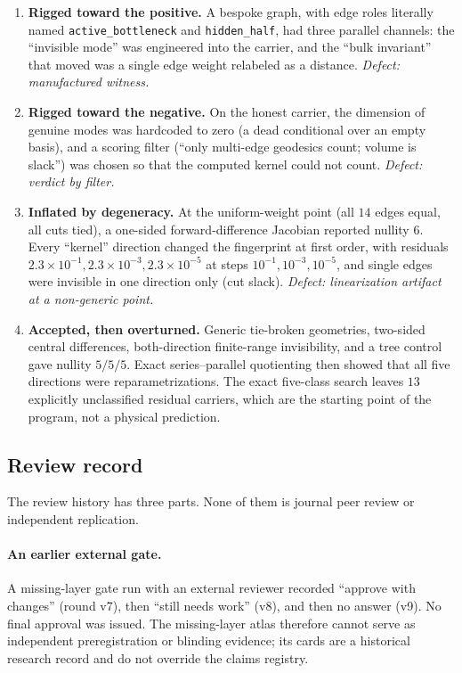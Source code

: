 \documentclass[11pt]{article}
\theoremstyle{definition}
\providecommand{\tightlist}{\setlength{\itemsep}{0pt}\setlength{\parskip}{0pt}}
\begin{document}
\begin{enumerate}\tightlist
\item \textbf{Rigged toward the positive.} A bespoke graph, with edge roles literally named
  \texttt{active\_bottleneck} and \texttt{hidden\_half}, had three parallel channels: the ``invisible mode'' was
  engineered into the carrier, and the ``bulk invariant'' that moved was a single edge weight relabeled as a distance.
  \emph{Defect: manufactured witness.}
\item \textbf{Rigged toward the negative.} On the honest carrier, the dimension of genuine modes was hardcoded to zero
  (a dead conditional over an empty basis), and a scoring filter (``only multi-edge geodesics count; volume is slack'')
  was chosen so that the computed kernel could not count. \emph{Defect: verdict by filter.}
\item \textbf{Inflated by degeneracy.} At the uniform-weight point (all \(14\) edges equal, all cuts tied), a one-sided
  forward-difference Jacobian reported nullity \(6\). Every ``kernel'' direction changed the fingerprint at first
  order, with residuals \(2.3\times10^{-1},2.3\times10^{-3},2.3\times10^{-5}\) at steps \(10^{-1},10^{-3},10^{-5}\), and
  single edges were invisible in one direction only (cut slack). \emph{Defect: linearization artifact at a non-generic
  point.}
\item \textbf{Accepted, then overturned.} Generic tie-broken geometries, two-sided central differences, both-direction
  finite-range invisibility, and a tree control gave nullity \(5/5/5\). Exact series--parallel quotienting then showed
  that all five directions were reparametrizations. The exact five-class search leaves \(13\) explicitly unclassified
  residual carriers, which are the starting point of the program, not a physical prediction.
\end{enumerate}

\subsection{Review record}\label{review-record}

The review history has three parts. None of them is journal peer review or independent replication.

\paragraph{An earlier external gate.} A missing-layer gate run with an external reviewer recorded ``approve with
changes'' (round v7), then ``still needs work'' (v8), and then no answer (v9). No final approval was issued. The
missing-layer atlas therefore cannot serve as independent preregistration or blinding evidence; its cards are a
historical research record and do not override the claims registry.
\end{document}
